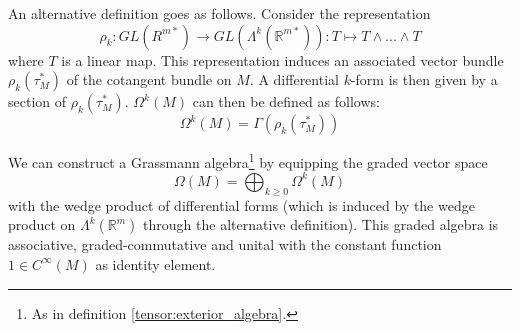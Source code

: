 	
	\begin{adefinition}
		An alternative definition goes as follows. Consider the representation \[\rho_k:GL(R^{m*})\rightarrow GL(\Lambda^k(\mathbb{R}^{m*})): T\mapsto T\wedge...\wedge T\] where $T$ is a linear map. This representation induces an associated vector bundle\footnotemark\ $\rho_k(\tau_M^*)$ of the cotangent bundle on $M$. A differential $k$-form is then given by a section of $\rho_k(\tau_M^*)$. $\Omega^k(M)$ can then be defined as follows: \[\Omega^k(M) = \Gamma(\rho_k(\tau_M^*))\]
	\end{adefinition}
	
	\begin{construct}
		We can construct a Grassmann algebra\footnote{As in definition \ref{tensor:exterior_algebra}.} by equipping the graded vector space
		\begin{equation}
			\Omega(M) = \bigoplus_{k\geq0}\Omega^k(M)
		\end{equation}
		with the wedge product of differential forms (which is induced by the wedge product on $\Lambda^k(\mathbb{R}^m)$ through the alternative definition). This graded algebra is associative, graded-commutative and unital with the constant function $1\in C^{\infty}(M)$ as identity element.
	\end{construct}

